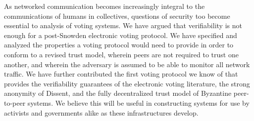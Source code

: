 As networked communication becomes increasingly integral to the communications
of humans in collectives, questions of security too become essential to analysis
of voting systems. We have argued that verifiability is not enough for a
post-Snowden electronic voting protocol. We have specified and analyzed the
properties a voting protocol would need to provide in order to conform to a
revised trust model, wherein peers are not required to trust one another, and
wherein the adversary is assumed to be able to monitor all network traffic. We
have further contributed the first voting protocol we know of that provides the
verifiability guarantees of the electronic voting literature, the strong
anonymity of Dissent, and the fully decentralized trust model of Byzantine
peer-to-peer systems. We believe this will be useful in constructing systems for
use by activists and governments alike as these infrastructures develop.
